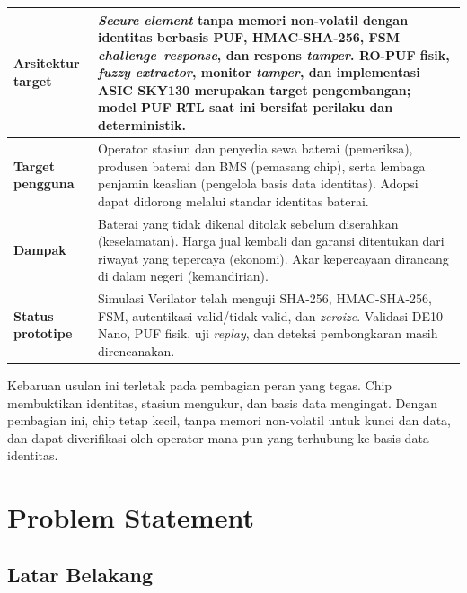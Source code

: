 \documentclass[11pt,a4paper]{article}
\newcommand{\hdr}[1]{\cellcolor{hdrgreen}\textbf{#1}}
\renewcommand{\arraystretch}{1.3}
\begin{document}
\begin{center}
\small
\renewcommand{\arraystretch}{1.12}
\begin{tabularx}{\linewidth}{|>{\raggedright\arraybackslash}p{3.1cm}|X|}
\hline
\hdr{Arsitektur target} & \emph{Secure element} tanpa memori non-volatil dengan identitas berbasis PUF, HMAC-SHA-256, FSM \emph{challenge--response}, dan respons \emph{tamper}. RO-PUF fisik, \emph{fuzzy extractor}, monitor \emph{tamper}, dan implementasi ASIC SKY130 merupakan target pengembangan; model PUF RTL saat ini bersifat perilaku dan deterministik. \\ \hline
\hdr{Target pengguna} & Operator stasiun dan penyedia sewa baterai (pemeriksa), produsen baterai dan BMS (pemasang chip), serta lembaga penjamin keaslian (pengelola basis data identitas). Adopsi dapat didorong melalui standar identitas baterai. \\ \hline
\hdr{Dampak} & Baterai yang tidak dikenal ditolak sebelum diserahkan (keselamatan). Harga jual kembali dan garansi ditentukan dari riwayat yang tepercaya (ekonomi). Akar kepercayaan dirancang di dalam negeri (kemandirian). \\ \hline
\hdr{Status prototipe} & Simulasi Verilator telah menguji SHA-256, HMAC-SHA-256, FSM, autentikasi valid/tidak valid, dan \emph{zeroize}. Validasi DE10-Nano, PUF fisik, uji \emph{replay}, dan deteksi pembongkaran masih direncanakan. \\ \hline
\end{tabularx}
\end{center}

Kebaruan usulan ini terletak pada pembagian peran yang tegas. Chip membuktikan identitas, stasiun mengukur, dan basis data mengingat. Dengan pembagian ini, chip tetap kecil, tanpa memori non-volatil untuk kunci dan data, dan dapat diverifikasi oleh operator mana pun yang terhubung ke basis data identitas.


\section{Problem Statement}

\subsection{Latar Belakang}
\end{document}
